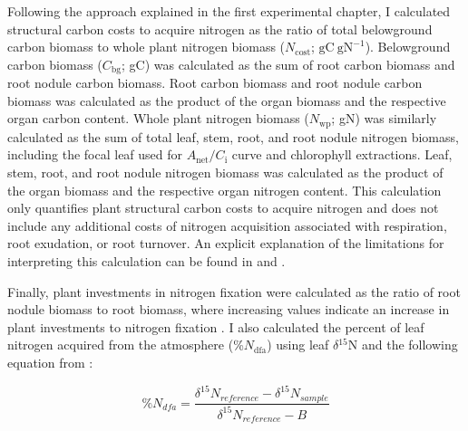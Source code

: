 Following the approach explained in the first experimental chapter, I calculated structural carbon costs to acquire nitrogen as the ratio of total belowground carbon biomass to whole plant nitrogen biomass ($N_\mathrm{cost}$; $\mathrm{gC\ gN^{-1}}$). Belowground carbon biomass ($C_\mathrm{bg}$; gC) was calculated as the sum of root carbon biomass and root nodule carbon biomass. Root carbon biomass and root nodule carbon biomass was calculated as the product of the organ biomass and the respective organ carbon content. Whole plant nitrogen biomass ($N_\mathrm{wp}$; gN) was similarly calculated as the sum of total leaf, stem, root, and root nodule nitrogen biomass, including the focal leaf used for $A_\mathrm{{net}}/C_\mathrm{i}$ curve and chlorophyll extractions. Leaf, stem, root, and root nodule nitrogen biomass was calculated as the product of the organ biomass and the respective organ nitrogen content. This calculation only quantifies plant structural carbon costs to acquire nitrogen and does not include any additional costs of nitrogen acquisition associated with respiration, root exudation, or root turnover. An explicit explanation of the limitations for interpreting this calculation can be found in  and .

Finally, plant investments in nitrogen fixation were calculated as the ratio of root nodule biomass to root biomass, where increasing values indicate an increase in plant investments to nitrogen fixation . I also calculated the percent of leaf nitrogen acquired from the atmosphere (\%$N_\mathrm{dfa}$) using leaf $\delta\mathrm{^{15}{N}}$ and the following equation from :

\begin{equation} \label{eqn_5.11}
    \%N_{dfa} = \frac{\delta^{15}N{}_{reference} - \delta^{15}N{}_{sample}}{\delta^{15}N{}_{reference} - B}
\end{equation}
    
